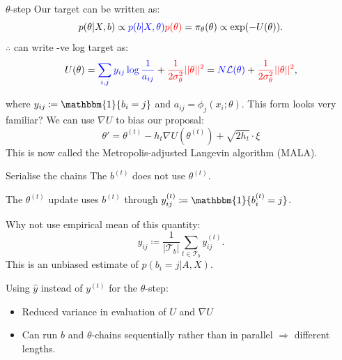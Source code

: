 \documentclass{beamer}
\newcommand{\Lcal}{\mathcal{L}}
\newcommand{\Tcal}{\mathcal{T}}
\newcommand{\one}{\mathbbm{1}}
\begin{document}
	\begin{frame}{$\theta$-step}
		Our target can be written as:
		$$p(\theta | X, b) \propto
		{\color{blue} p(b |X, \theta)} 
		{\color{red}p(\theta)}
		= \pi_\theta(\theta) \propto \exp(-U(\theta)).$$
		$\therefore$ can write -ve log target as:
		$$U(\theta) 
		= {\color{blue} \sum_{i,j} y_{ij} \log \frac{1}{a_{ij}} } + 
		{\color{red} \frac{1}{2\sigma_\theta^2} || \theta ||^2} 
		= {\color{blue} N \Lcal(\theta)} 
		+ {\color{red} \frac{1}{2\sigma_\theta^2} ||\theta||^2 },$$
		
		where $y_{ij} \coloneqq \one \{b_i = j\}$ and $a_{ij} = \phi_{j}(x_i; \theta)$. This form looks very familiar? We can use $\nabla U$ to bias our proposal:
		$$\theta' = \theta^{(t)} - h_t \nabla U \left(\theta^{(t)} \right) + \sqrt{2h_t} \cdot \xi$$
		This is now called the Metropolis-adjusted Langevin algorithm (MALA).
	\end{frame}

	\begin{frame}{Serialise the chains}
		The $b^{(t)}$ does not use $\theta^{(t)}$.
		
		The $\theta^{(t)}$ update uses $b^{(t)}$ through $y^{(t)}_{ij} \coloneqq \one\{b^{(t)}_i = j\}$.
		
		Why not use empirical mean of this quantity:		
		$$\hat{y}_{ij} \coloneqq \frac{1}{|\Tcal_b|} \sum_{t \in \Tcal_b} y_{ij}^{(t)}.$$
		This is an unbiased estimate of $p(b_i=j|A,X)$.
		
		Using $\hat{y}$ instead of $y^{(t)}$ for the $\theta$-step:
		\begin{itemize}
			\item Reduced variance in evaluation of $U$ and $\nabla U$
			\item Can run $b$ and $\theta$-chains sequentially rather than in parallel $\Rightarrow$ different lengths.
		\end{itemize}
	\end{frame}
\end{document}
